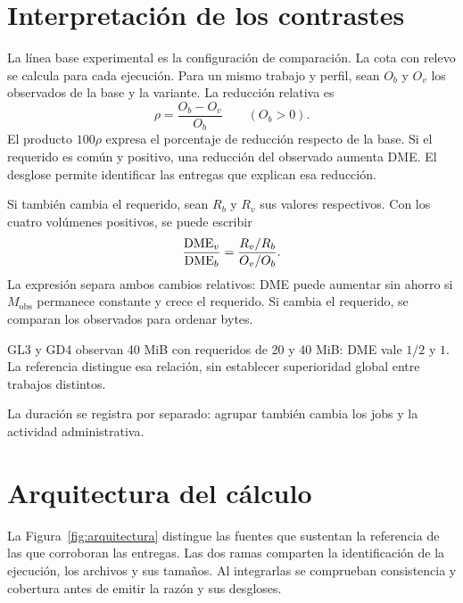 \section{Interpretación de los contrastes}
La línea base experimental es la configuración de comparación. La cota con relevo se calcula para cada ejecución. Para un mismo trabajo y perfil, sean $O_b$ y $O_v$ los observados de la base y la variante. La reducción relativa es
\begin{equation}
\rho=\frac{O_b-O_v}{O_b}\qquad(O_b>0).
\end{equation}
El producto $100\rho$ expresa el porcentaje de reducción respecto de la base. Si el requerido es común y positivo, una reducción del observado aumenta DME. El desglose permite identificar las entregas que explican esa reducción.

Si también cambia el requerido, sean $R_b$ y $R_v$ sus valores respectivos. Con los cuatro volúmenes positivos, se puede escribir
\begin{equation}
\frac{\mathrm{DME}_v}{\mathrm{DME}_b}=\frac{R_v/R_b}{O_v/O_b}.
\end{equation}
La expresión separa ambos cambios relativos: DME puede aumentar sin ahorro si $M_{\mathrm{obs}}$ permanece constante y crece el requerido. Si cambia el requerido, se comparan los observados para ordenar bytes.



GL3 y GD4 observan 40 MiB con requeridos de 20 y 40 MiB: DME vale $1/2$ y $1$. La referencia distingue esa relación, sin establecer superioridad global entre trabajos distintos.

La duración se registra por separado: agrupar también cambia los jobs y la actividad administrativa.

\section{Arquitectura del cálculo}
La Figura~\ref{fig:arquitectura} distingue las fuentes que sustentan la referencia de las que corroboran las entregas. Las dos ramas comparten la identificación de la ejecución, los archivos y sus tamaños. Al integrarlas se comprueban consistencia y cobertura antes de emitir la razón y sus desgloses.


